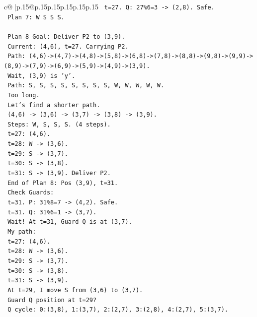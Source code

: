 \documentclass{article}
\begin{document}
{\begin{supertabular}{c@{$\;$}|p{.15\linewidth}@{}p{.15\linewidth}p{.15\linewidth}p{.15\linewidth}p{.15\linewidth}p{.15\linewidth}}
{{{\texttt{    t=27. Q: 27\%6=3 {-}> (2,8). Safe.} \\
\texttt{    Plan 7: W S S S.} \\
\\ 
\texttt{    Plan 8 Goal: Deliver P2 to (3,9).} \\
\texttt{    Current: (4,6), t=27. Carrying P2.} \\
\texttt{    Path: (4,6){-}>(4,7){-}>(4,8){-}>(5,8){-}>(6,8){-}>(7,8){-}>(8,8){-}>(9,8){-}>(9,9){-}>(8,9){-}>(7,9){-}>(6,9){-}>(5,9){-}>(4,9){-}>(3,9).} \\
\texttt{    Wait, (3,9) is 'y'.} \\
\texttt{    Path: S, S, S, S, S, S, S, S, W, W, W, W, W.} \\
\texttt{    Too long.} \\
\texttt{    Let's find a shorter path.} \\
\texttt{    (4,6) {-}> (3,6) {-}> (3,7) {-}> (3,8) {-}> (3,9).} \\
\texttt{    Steps: W, S, S, S. (4 steps).} \\
\texttt{    t=27: (4,6).} \\
\texttt{    t=28: W {-}> (3,6).} \\
\texttt{    t=29: S {-}> (3,7).} \\
\texttt{    t=30: S {-}> (3,8).} \\
\texttt{    t=31: S {-}> (3,9). Deliver P2.} \\
\texttt{    End of Plan 8: Pos (3,9), t=31.} \\
\texttt{    Check Guards:} \\
\texttt{    t=31. P: 31\%8=7 {-}> (4,2). Safe.} \\
\texttt{    t=31. Q: 31\%6=1 {-}> (3,7).} \\
\texttt{    Wait! At t=31, Guard Q is at (3,7).} \\
\texttt{    My path:} \\
\texttt{    t=27: (4,6).} \\
\texttt{    t=28: W {-}> (3,6).} \\
\texttt{    t=29: S {-}> (3,7).} \\
\texttt{    t=30: S {-}> (3,8).} \\
\texttt{    t=31: S {-}> (3,9).} \\
\texttt{    At t=29, I move S from (3,6) to (3,7).} \\
\texttt{    Guard Q position at t=29?} \\
\texttt{    Q cycle: 0:(3,8), 1:(3,7), 2:(2,7), 3:(2,8), 4:(2,7), 5:(3,7).} \\
}}}
\end{supertabular}}
\end{document}
